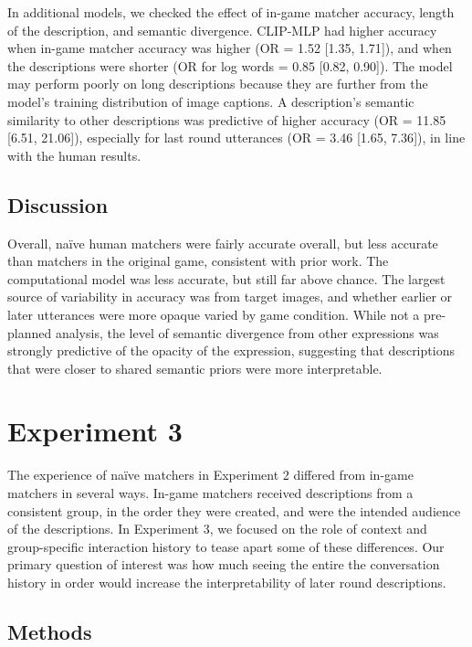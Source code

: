 \documentclass[10pt, letterpaper]{article}
\begin{document}
In additional models, we checked the effect of in-game matcher accuracy,
length of the description, and semantic divergence. CLIP-MLP had higher
accuracy when in-game matcher accuracy was higher (OR = 1.52 {[}1.35,
1.71{]}), and when the descriptions were shorter (OR for log words =
0.85 {[}0.82, 0.90{]}). The model may perform poorly on long
descriptions because they are further from the model's training
distribution of image captions. A description's semantic similarity to
other descriptions was predictive of higher accuracy (OR = 11.85
{[}6.51, 21.06{]}), especially for last round utterances (OR = 3.46
{[}1.65, 7.36{]}), in line with the human results.

\subsection{Discussion}\label{discussion}

Overall, naïve human matchers were fairly accurate overall, but less
accurate than matchers in the original game, consistent with prior work.
The computational model was less accurate, but still far above chance.
The largest source of variability in accuracy was from target images,
and whether earlier or later utterances were more opaque varied by game
condition. While not a pre-planned analysis, the level of semantic
divergence from other expressions was strongly predictive of the opacity
of the expression, suggesting that descriptions that were closer to
shared semantic priors were more interpretable.

\section{Experiment 3}\label{experiment-3}

The experience of naïve matchers in Experiment 2 differed from in-game
matchers in several ways. In-game matchers received descriptions from a
consistent group, in the order they were created, and were the intended
audience of the descriptions. In Experiment 3, we focused on the role of
context and group-specific interaction history to tease apart some of
these differences. Our primary question of interest was how much seeing
the entire the conversation history in order would increase the
interpretability of later round descriptions.

\subsection{Methods}\label{methods-2}
\end{document}
